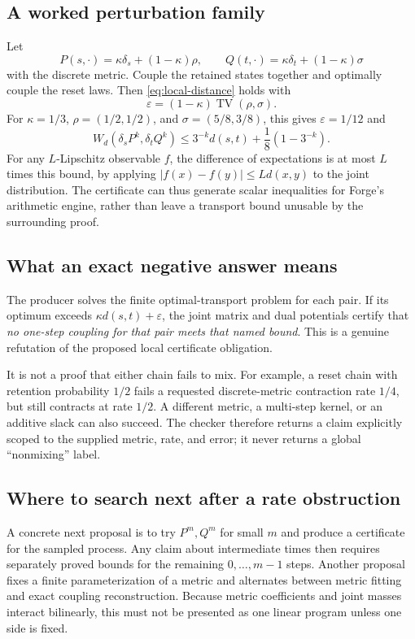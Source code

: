 \documentclass[11pt,letterpaper]{article}
\theoremstyle{definition}\newtheorem{definition}[theorem]{Definition}
\theoremstyle{remark}\newtheorem{remark}[theorem]{Remark}
\newcommand{\TV}{\operatorname{TV}}
\begin{document}
\subsection{A worked perturbation family}
Let
\[
 P(s,\cdot)=\kappa\delta_s+(1-\kappa)\rho,
 \qquad Q(t,\cdot)=\kappa\delta_t+(1-\kappa)\sigma
\]
with the discrete metric. Couple the retained states together and optimally couple the reset laws. Then \eqref{eq:local-distance} holds with
\[
 \varepsilon=(1-\kappa)\TV(\rho,\sigma).
\]
For $\kappa=1/3$, $\rho=(1/2,1/2)$, and $\sigma=(5/8,3/8)$, this gives $\varepsilon=1/12$ and
\[
 W_d(\delta_sP^k,\delta_tQ^k)
 \le 3^{-k}d(s,t)+\frac18(1-3^{-k}).
\]
For any $L$-Lipschitz observable $f$, the difference of expectations is at most $L$ times this bound, by applying $|f(x)-f(y)|\le Ld(x,y)$ to the joint distribution. The certificate can thus generate scalar inequalities for Forge's arithmetic engine, rather than leave a transport bound unusable by the surrounding proof.

\subsection{What an exact negative answer means}
The producer solves the finite optimal-transport problem for each pair. If its optimum exceeds $\kappa d(s,t)+\varepsilon$, the joint matrix and dual potentials certify that \emph{no one-step coupling for that pair meets that named bound}. This is a genuine refutation of the proposed local certificate obligation.

It is not a proof that either chain fails to mix. For example, a reset chain with retention probability $1/2$ fails a requested discrete-metric contraction rate $1/4$, but still contracts at rate $1/2$. A different metric, a multi-step kernel, or an additive slack can also succeed. The checker therefore returns a claim explicitly scoped to the supplied metric, rate, and error; it never returns a global ``nonmixing'' label.

\subsection{Where to search next after a rate obstruction}
A concrete next proposal is to try $P^m,Q^m$ for small $m$ and produce a certificate for the sampled process. Any claim about intermediate times then requires separately proved bounds for the remaining $0,\ldots,m-1$ steps. Another proposal fixes a finite parameterization of a metric and alternates between metric fitting and exact coupling reconstruction. Because metric coefficients and joint masses interact bilinearly, this must not be presented as one linear program unless one side is fixed.
\end{document}
